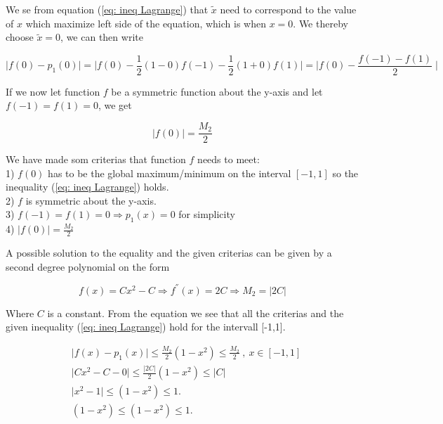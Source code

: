 We se from equation (\ref{eq: ineq Lagrange}) that $\tilde{x}$ need to correspond to the value of $x$ which maximize left side of the equation, which is when $x=0$. We thereby choose $\tilde{x}=0$, we can then write 

\begin{equation}
\label{eq: equal Lagrange 3}
\mid f(0)-p_{1}(0) \mid = \mid f(0) - \frac{1}{2}(1-0)f(-1) - \frac{1}{2}(1+0)f(1) \mid = \mid f(0)-\frac{f(-1) -f(1)}{2} \mid
\end{equation}

If we now let function $f$ be a symmetric function about the y-axis and let $f(-1)=f(1)=0$, we get

\begin{equation}
\label{eq: equal Lagrange 4}
\mid f(0) \mid = \frac{M_2}{2}
\end{equation} 

We have made som criterias that function $f$ needs to meet:\\ 
1) $f(0)$ has to be the global maximum/minimum on the interval $[-1,1]$ so the inequality (\ref{eq: ineq Lagrange}) holds.\\
2) $f$ is symmetric about the  y-axis.\\
3) $f(-1)=f(1)=0 \Longrightarrow p_1(x)=0$ for simplicity\\
4) $\mid f(0) \mid = \frac{M_2}{2}$
\newpage

A possible solution to the equality and the given criterias can be given by a second degree polynomial on the form

\begin{equation}
\label{eq: Solution 1}
f(x)=Cx^2-C \Longrightarrow f^{''}(x)=2C\Longrightarrow M_2=|2C|
\end{equation}



Where $C$ is a constant. From the equation we see that all the criterias and the given inequality (\ref{eq: ineq Lagrange}) hold for the intervall [-1,1].

\begin{equation}
\label{eq: Solution 2}
\begin{split}
&\mid f(x)-p_{1}(x)\mid \leq \frac{M_{2}}{2}(1-x^{2})\leq\frac{M_{2}}{2} \: , \: x\in[-1,1] \\
&\mid Cx^{2}-C - 0\mid \leq \frac{|2C|}{2}(1-x^{2}) \leq |C|\\
&\mid x^{2} -1 \mid \leq (1-x^2) \leq 1.\\
&(1-x^2)\leq(1-x^2) \leq 1.\\
\end{split}
\end{equation}







